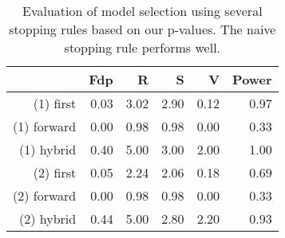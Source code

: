 \begin{table}[ht]
\centering
\begin{tabular}{rrrrrr}
  \hline
 & Fdp & R & S & V & Power \\ 
  \hline
(1) first & 0.03 & 3.02 & 2.90 & 0.12 & 0.97 \\ 
  (1) forward & 0.00 & 0.98 & 0.98 & 0.00 & 0.33 \\ 
  (1) hybrid & 0.40 & 5.00 & 3.00 & 2.00 & 1.00 \\ 
  (2) first & 0.05 & 2.24 & 2.06 & 0.18 & 0.69 \\ 
  (2) forward & 0.00 & 0.98 & 0.98 & 0.00 & 0.33 \\ 
  (2) hybrid & 0.44 & 5.00 & 2.80 & 2.20 & 0.93 \\ 
   \hline
\end{tabular}
\caption{Evaluation of model selection using several stopping rules based on our p-values. The naive stopping rule performs well.} 
\end{table}

